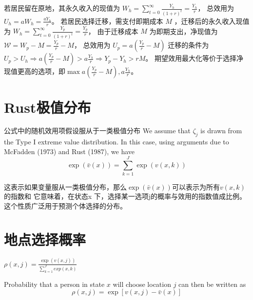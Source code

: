 \documentclass[a4paper,12pt,oneside]{book} %
\begin{document}
若居民留在原地，其永久收入的现值为
$W_h = \sum\limits_{t=0}^\infty \frac{Y_h}{(1+r)^t}=\frac{Y_h}{r}$，
总效用为$U_h=a W_h = \frac{a Y_h}{r}$。
若居民选择迁移，需支付即期成本 
$M$
，迁移后的永久收入现值为
$W_h = \sum\limits_{t=0}^\infty \frac{Y_p}{(1+r)^t}=\frac{Y_p}{r}$，
由于迁移成本 
$M$
为即期支出，净现值为
$\mathcal{W}=W_p-M=\frac{Y_p}{r}-M$，
总效用为
$U_p=a(\frac{Y_p}{r}-M)$
迁移的条件为$U_p>U_h \Rightarrow a(\frac{Y_p}{r}-M) > a \frac{ Y_h}{r} \Rightarrow Y_p-Y_h > rM$。
期望效用最大化等价于选择净现值更高的选项，即$\max{a(\frac{Y_p}{r}-M), a \frac{ Y_h}{r}}$。

\chapter{Rust极值分布}
公式中的随机效用项假设服从于一类极值分布
We assume that $\zeta_j$ is drawn from the Type I extreme value distribution. In this case, using arguments due to McFadden (1973) and Rust (1987), we have
$$\exp\left(\bar{v}(x)\right) = \sum_{k=1}^J \exp\left(v(x, k)\right)$$

这表示如果变量服从一类极值分布，那么$\exp\left(\bar{v}(x)\right)$可以表示为所有$v(x, k)$的指数和
它意味着，在状态x 下，选择某一选项j的概率与效用的指数值成比例。
这个性质广泛用于预测个体选择的分布。

\chapter{地点选择概率}
$\rho(x,j)=\frac{\exp(v(x,j))}{\sum\limits_{k=1}^{J} exp(x,k)}$

Probability that a person in state $x$ will choose location $j$ can then be written as
$$\rho(x,j)=\exp[v(x,j)-\bar v(x)]$$



\newpage


\end{document}
